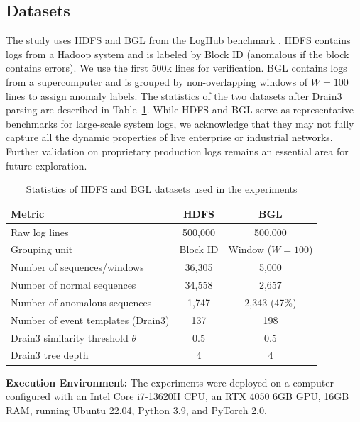 \documentclass[conference]{IEEEtran}
\begin{document}
\subsection{Datasets}
The study uses HDFS and BGL from the LogHub benchmark \cite{b6,b12}. HDFS contains logs from a Hadoop system and is labeled by Block ID (anomalous if the block contains errors). We use the first 500k lines for verification. BGL contains logs from a supercomputer and is grouped by non-overlapping windows of $W{=}100$ lines to assign anomaly labels. The statistics of the two datasets after Drain3 parsing are described in Table~\ref{tab_dataset_stats}. While HDFS and BGL serve as representative benchmarks for large-scale system logs, we acknowledge that they may not fully capture all the dynamic properties of live enterprise or industrial networks. Further validation on proprietary production logs remains an essential area for future exploration.

\begin{table}[!t]
\caption{Statistics of HDFS and BGL datasets used in the experiments}
\begin{center}
\scriptsize
\begin{tabular}{lcc}
\toprule
\textbf{Metric} & \textbf{HDFS} & \textbf{BGL} \\
\midrule
Raw log lines & 500,000 & 500,000 \\
Grouping unit & Block ID & Window ($W{=}100$) \\
Number of sequences/windows & 36,305 & 5,000 \\
Number of normal sequences & 34,558 & 2,657 \\
Number of anomalous sequences & 1,747 & 2,343 (47\%) \\
Number of event templates (Drain3) & 137 & 198 \\
Drain3 similarity threshold $\theta$ & 0.5 & 0.5 \\
Drain3 tree depth & 4 & 4 \\
\bottomrule
\end{tabular}
\label{tab_dataset_stats}
\end{center}
\end{table}

\textbf{Execution Environment:} The experiments were deployed on a computer configured with an Intel Core i7-13620H CPU, an RTX 4050 6GB GPU, 16GB RAM, running Ubuntu 22.04, Python 3.9, and PyTorch 2.0.
\end{document}
